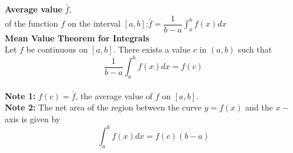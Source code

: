 \documentclass{ximera}
\begin{document}
\textbf{Average value} $\bar{f}$,\\
 of the function $f$ on the interval $[a,b]$:\hspace{0.6in}$\bar{f} = \dfrac{1}{b-a}\displaystyle \int_{a}^{ b} f(x) dx $\\[1.3em]
 \textbf{Mean Value Theorem for Integrals}\\[1em]
 Let $f$ be continuous on $[a,b]$. There exists a value $c$ in $(a,b)$ such that\\[1em]
                                       \[
                                  \dfrac{1}{b-a}\displaystyle \int_{a}^{ b} f(x) dx=f(c)
                                       \]\\[1em]
      \textbf{Note 1:} $ f(c)=\bar{f}$, the average value of $f$ on $[a,b]$.\\[1em]  
       \textbf{Note 2:} The net area of the region between the curve $y=f(x)$ and the $x-$axis is given by \\

      \[
       \displaystyle \int_{a}^{ b} f(x) dx=f(c)(b-a)
       \] 
\end{document}
